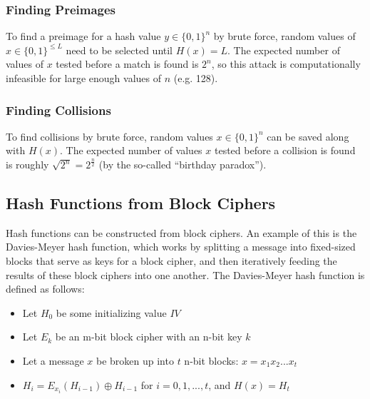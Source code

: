 \documentclass[12pt,titlepage]{article}
\begin{document}
      \subsubsection{Finding Preimages}
        To find a preimage for a hash value $y \in \{0, 1\}^n$ by brute force, random values of $x \in \{0, 1\}^{\leq L}$ need to be selected until $H(x) = L$. The expected number
        of values of $x$ tested before a match is found is $2^n$, so this attack is computationally infeasible for large enough values of $n$ (e.g. 128).

      \subsubsection{Finding Collisions}
        To find collisions by brute force, random values $x \in \{0, 1\}^n$ can be saved along with $H(x)$. The expected number of values $x$ tested before a collision is found is
        roughly $\sqrt{2^n} = 2^{\frac{n}{2}}$ (by the so-called ``birthday paradox'').

    \subsection{Hash Functions from Block Ciphers}
      Hash functions can be constructed from block ciphers. An example of this is the Davies-Meyer hash function, which works by splitting a message into fixed-sized blocks
      that serve as keys for a block cipher, and then iteratively feeding the results of these block ciphers into one another. The Davies-Meyer hash function is defined as
      follows:
      \begin{itemize}
        \item Let $H_0$ be some initializing value $IV$
        \item Let $E_k$ be an m-bit block cipher with an n-bit key $k$
        \item Let a message $x$ be broken up into $t$ n-bit blocks: $x = x_1x_2 . . . x_t$
        \item $H_i = E_{x_i}(H_{i-1}) \oplus H_{i-1}$ for $i = 0, 1, ..., t$, and $H(x) = H_t$
      \end{itemize}
\end{document}
